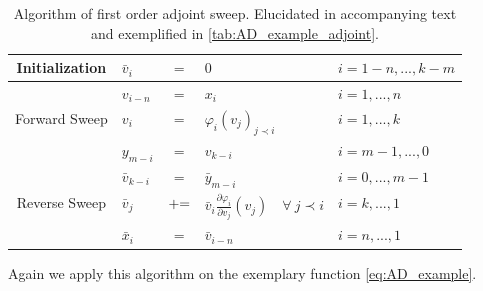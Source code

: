 \documentclass{scrartcl}[12pt, halfparskip]
\numberwithin{equation}{section}
\numberwithin{figure}{section}
\numberwithin{table}{section}
\begin{document}
\begin{table}[H]
	\centering
	\caption{Algorithm of first order adjoint sweep. Elucidated in accompanying text and exemplified in \cref{tab:AD_example_adjoint}.}
	\begin{tabular}{| c | l c l | l |} \hline
		Initialization & $\bar{v}_i$ & $=$ & $0$ & $i=1-n,...,k-m$ \\ \hline
		& $v_{i-n}$ & $=$ & $x_i$ & $i=1,...,n$ \\
		Forward Sweep & $v_{i}$ & $=$ & $\varphi_i(v_j)_{j \prec i}$ & $i=1,...,k$ \\
		& $y_{m-i}$ & $=$ & $v_{k-i}$ & $i=m-1,...,0$ \\ \hline
		& $\bar{v}_{k-i}$ & $=$ & $\bar{y}_{m-i}$ & $i=0,...,m-1$ \\
		Reverse Sweep & $\bar{v}_j$ & $+ \hspace{-0.1cm} =$ & $\bar{v}_i \frac{\partial \varphi_i}{\partial v_j}(v_j) \quad \forall \ j \prec i$ & $i=k,...,1$ \\
		& $\bar{x}_i$ & $=$ & $\bar{v}_{i-n}$ & $i=n,...,1$ \\ \hline
	\end{tabular}
	\label{tab:first_order_adjoint_sweep}
\end{table}

Again we apply this algorithm on the exemplary function \cref{eq:AD_example}.
\end{document}
